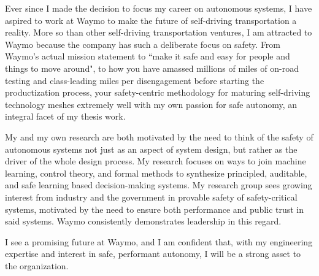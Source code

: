 Ever since I made the decision to focus my career on autonomous systems, I have aspired to work at Waymo to make the future of self-driving transportation a reality. More so than other self-driving transportation ventures, I am attracted to Waymo because the company has such a deliberate focus on safety. From Waymo's actual mission statement to ``make it safe and easy for people and things to move around", to how you have amassed millions of miles of on-road testing and class-leading miles per disengagement before starting the productization process, your safety-centric methodology for maturing self-driving technology meshes extremely well with my own passion for safe autonomy, an integral facet of my thesis work. 

My  and my own research are both motivated by the need to think of the safety of autonomous systems not just as an aspect of system design, but rather as the driver of the whole design process. My research focuses on ways to join machine learning, control theory, and formal methods to synthesize principled, auditable, and safe learning based decision-making systems. My research group sees growing interest from industry and the government in provable safety of safety-critical systems, motivated by the need to ensure both performance and public trust in said systems. Waymo consistently demonstrates leadership in this regard.

I see a promising future at Waymo, and I am confident that, with my engineering expertise and interest in safe, performant autonomy, I will be a strong asset to the organization.